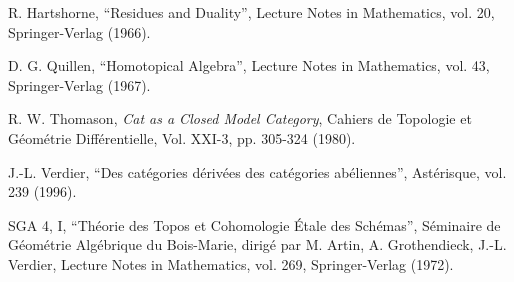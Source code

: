 \documentclass[11pt]{article}
\begin{document}
\noindent R. Hartshorne, ``Residues and Duality'', Lecture Notes in Mathematics, vol. 20, Springer-Verlag (1966).

\noindent D. G. Quillen, ``Homotopical Algebra'', Lecture Notes in Mathematics, vol. 43, Springer-Verlag (1967).

\noindent R. W. Thomason, \textit{Cat as a Closed Model Category}, Cahiers de Topologie et Géométrie Différentielle, Vol. XXI-3, pp. 305-324 (1980).

\noindent J.-L. Verdier, ``Des catégories dérivées des catégories abéliennes'', Astérisque, vol. 239 (1996).

\noindent SGA 4, I, ``Théorie des Topos et Cohomologie Étale des Schémas'', Séminaire de Géométrie Algébrique du Bois-Marie, dirigé par M. Artin, A. Grothendieck, J.-L. Verdier, Lecture Notes in Mathematics, vol. 269, Springer-Verlag (1972).
\end{document}
